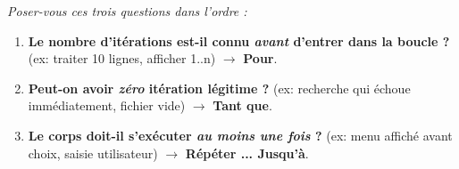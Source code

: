 \documentclass[11pt]{article}
\begin{document}
\begin{methode}
\emph{Poser-vous ces trois questions dans l'ordre :}
\begin{enumerate}
    \item \textbf{Le nombre d'itérations est-il connu \emph{avant} d'entrer dans la boucle ?} (ex: traiter 10 lignes, afficher 1..n) $\rightarrow$ \textbf{Pour}.
    \item \textbf{Peut-on avoir \emph{zéro} itération légitime ?} (ex: recherche qui échoue immédiatement, fichier vide) $\rightarrow$ \textbf{Tant que}.
    \item \textbf{Le corps doit-il s'exécuter \emph{au moins une fois} ?} (ex: menu affiché avant choix, saisie utilisateur) $\rightarrow$ \textbf{Répéter ... Jusqu'à}.
\end{enumerate}
\end{methode}
\end{document}
